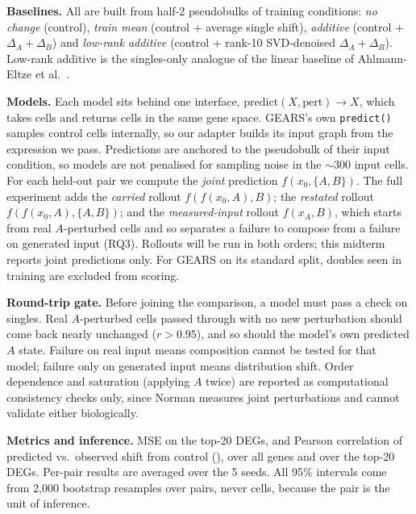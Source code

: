 \noindent\textbf{Baselines.} All are built from half-2 pseudobulks of training conditions:
\emph{no change} (control), \emph{train mean} (control + average single shift),
\emph{additive} (control + $\Delta_A + \Delta_B$) and \emph{low-rank additive} (control +
rank-10 SVD-denoised $\Delta_A + \Delta_B$). Low-rank additive is the singles-only analogue
of the linear baseline of Ahlmann-Eltze et al.~\cite{ahlmann2025}.

\noindent\textbf{Models.} Each model sits behind one interface, $\mathrm{predict}(X,
\mathrm{pert}) \to X$, which takes cells and returns cells in the same gene space. GEARS's
own \texttt{predict()} samples control cells internally, so our adapter builds its input
graph from the expression we pass. Predictions are anchored to the pseudobulk of their input
condition, so models are not penalised for sampling noise in the $\sim$300 input cells. For
each held-out pair we compute the \emph{joint} prediction $f(x_0, \{A, B\})$. The full
experiment adds the \emph{carried} rollout $f(f(x_0, A), B)$; the \emph{restated} rollout
$f(f(x_0, A), \{A, B\})$; and the \emph{measured-input} rollout $f(x_A, B)$, which starts
from real $A$-perturbed cells and so separates a failure to compose from a failure on
generated input (RQ3). Rollouts will be run in both orders; this midterm reports joint
predictions only. For GEARS on its standard split, doubles seen in
training are excluded from scoring.

\noindent\textbf{Round-trip gate.} Before joining the comparison, a model must pass a check
on singles. Real $A$-perturbed cells passed through with no new perturbation should come
back nearly unchanged ($r > 0.95$), and so should the model's own predicted $A$ state.
Failure on real input means composition cannot be tested for that model; failure only on
generated input means distribution shift. Order dependence and saturation (applying $A$
twice) are reported as computational consistency checks only, since Norman measures joint
perturbations and cannot validate either biologically.

\noindent\textbf{Metrics and inference.} MSE on the top-20 DEGs, and Pearson correlation of
predicted vs.\ observed shift from control (\pd), over all genes and over the top-20 DEGs.
Per-pair results are averaged over the 5 seeds. All 95\% intervals come from 2,000 bootstrap
resamples over pairs, never cells, because the pair is the unit of inference.
